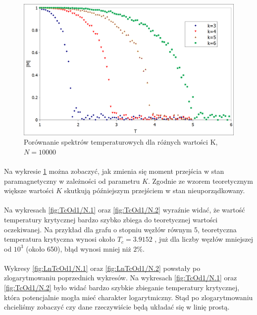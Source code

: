 \documentclass[12pt,a4paper]{article}
\begin{document}
\begin{figure}[H]
\includegraphics[width=\textwidth]{rozne_K.png}
\caption{Porównanie spektrów temperaturowych dla różnych wartości K, $N=10000$}
\label{fig:rozne_K}
\end{figure}

\paragraph{}
Na wykresie \ref{fig:rozne_K} można zobaczyć, jak zmienia się moment przejścia w stan paramagnetyczny w zależności od parametru $K$. Zgodnie ze wzorem teoretycznym większe wartości $K$ skutkują późniejszym przejściem w stan nieuporządkowany.

\paragraph{}
Na wykresach \ref{fig:TcOd1/N.1} oraz \ref{fig:TcOd1/N.2} wyraźnie widać, że wartość temperatury krytycznej bardzo szybko zbiega do teoretycznej wartości oczekiwanej. Na przykład dla grafu o stopniu węzłów równym 5, teoretyczna temperatura krytyczna wynosi około $T_{c} = 3.9152$ , już dla liczby węzłów mniejszej od $10^3$ (około 650), błąd wynosi mniej niż $2\%$.

\paragraph{}
Wykresy \ref{fig:LnTcOd1/N.1} oraz \ref{fig:LnTcOd1/N.2} powstały po zlogarytmowaniu poprzednich wykresów. Na wykresach \ref{fig:TcOd1/N.1} oraz \ref{fig:TcOd1/N.2} było widać bardzo szybkie zbieganie temperatury krytycznej, która potencjalnie mogła mieć charakter logarytmiczny. Stąd po zlogarytmowaniu chcieliśmy zobaczyć czy dane rzeczywiście będą układać się w linię prostą.
\end{document}
